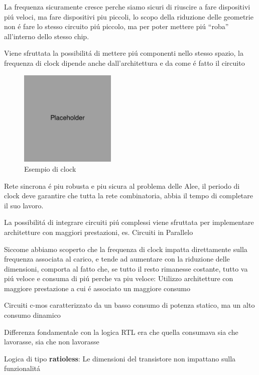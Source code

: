 \documentclass{article}
\begin{document}
La frequenza sicuramente cresce perche siamo sicuri di riuscire a fare dispositivi pi\'u veloci, ma fare dispositivi piu piccoli, lo scopo della riduzione delle geometrie non \'e fare lo stesso circuito pi\'u piccolo, ma per poter mettere pi\'u ``roba'' all'interno dello stesso chip.

Viene sfruttata la possibilit\'a di mettere pi\'u componenti nello stesso spazio, la frequenza di clock dipende anche dall'architettura e da come \'e fatto il circuito


\begin{figure}[h]
    \centering
    \includegraphics[width=1.8in]{placeholder.jpg}
    \caption{Esempio di clock}
\end{figure}

Rete sincrona \'e piu robusta e piu sicura al problema delle Alee, il periodo di clock deve garantire che tutta la rete combinatoria, abbia il tempo di completare il suo lavoro.

La possibilit\'a di integrare circuiti pi\'u complessi viene sfruttata per implementare architetture con maggiori prestazioni, es. Circuiti in Parallelo

Siccome abbiamo scoperto che la frequenza di clock impatta direttamente sulla frequenza associata al carico, e tende ad aumentare con la riduzione delle dimensioni, comporta al fatto che, se tutto il resto rimanesse costante, tutto va pi\'u veloce e consuma di pi\'u perche va piu veloce: Utilizzo architetture con maggiore prestazione a cui \'e associato un maggiore consumo

Circuiti c-mos caratterizzato da un basso consumo di potenza statico, ma un alto consumo dinamico

Differenza fondamentale con la logica RTL era che quella consumava sia che lavorasse, sia che non lavorasse

Logica di tipo \textbf{ratioless}: Le dimensioni del transistore non impattano sulla funzionalit\'a
\end{document}
